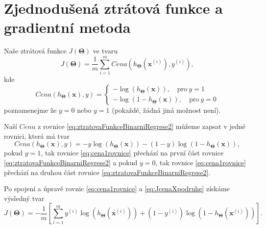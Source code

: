 \section{Zjednodušená ztrátová funkce a gradientní metoda}

\par{Naše ztrátová funkce $J \left( \bm{\Theta} \right)$ ve tvaru
\begin{equation}
	J \left( \bm{\Theta} \right) = \frac{1}{m} \sum_{i=1}^{m} Cena \left( h_{\bm{\Theta}} \left( \bm{x}^{\left( i \right)} \right), y^{\left( i \right)} \right),
	\label{eq:JcenaXpodruhe}
\end{equation}
kde
\begin{equation}
	\label{eq:ztratovaFunkceBinarniRegrese2}
	Cena \left( h_{\bm{\Theta}} \left( \bm{x} \right), y \right) = \left\{
	\begin{array}{r}
		{- \log \left( h_{\bm{\Theta}} \left( \bm{x} \right) \right), \quad \textrm{pro}~y = 1} \\
		{- \log \left( 1 - h_{\bm{\Theta}} \left( \bm{x} \right) \right), \quad \textrm{pro}~y = 0}
	\end{array}
	\right.
\end{equation}
poznamenejme že $y = 0$ nebo $y = 1$ (pokaždé, žádná jiná možnost není).}

\par{Naší $Cenu$ z rovnice \ref{eq:ztratovaFunkceBinarniRegrese2} můžeme zapsat v jedné rovnici, která má tvar
\begin{equation}
	Cena \left( h_{\bm{\Theta}} \left( \bm{x} \right), y \right) = - y \log \left( h_{\bm{\Theta}} \left( \bm{x} \right) \right) - \left( 1 - y \right) \log \left( 1 - h_{\bm{\Theta}} \left( \bm{x} \right) \right),
	\label{eq:cena1rovnice}
\end{equation}
pokud $y = 1$, tak rovnice \ref{eq:cena1rovnice} přechází na první část rovnice \ref{eq:ztratovaFunkceBinarniRegrese2} a pokud $y = 0$, tak rovnice \ref{eq:cena1rovnice} přechází na druhou část rovnice \ref{eq:ztratovaFunkceBinarniRegrese2}.}

\par{Po spojení a úpravě rovnic \ref{eq:cena1rovnice} a \ref{eq:JcenaXpodruhe} získáme výsledný tvar
\begin{equation}
		J \left( \bm{\Theta} \right) = - \frac{1}{m} \left[ \sum_{i=1}^{m} y^{\left( i \right)} \log \left( h_{\bm{\Theta}} \left( \bm{x}^{\left( i \right)} \right) \right) + \left( 1 - y^{\left( i \right)} \right) \log \left( 1 - h_{\bm{\Theta}} \left( \bm{x}^{\left( i \right)} \right) \right) \right].
		\label{eq:ztratovaFunkceJbinarniRegrese}
\end{equation}}

